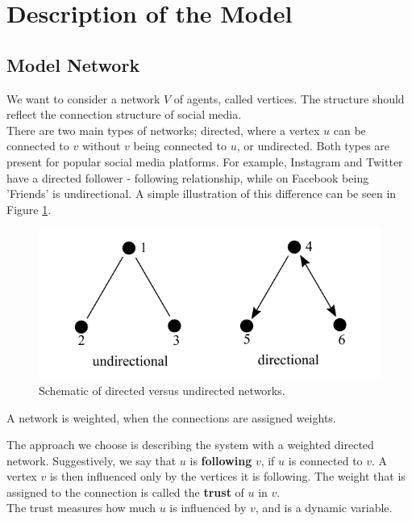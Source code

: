 \documentclass[11pt]{article}
\begin{document}
\section{Description of the Model}

\subsection{Model Network}

We want to consider a network $V$ of agents, called vertices. The structure should reflect the connection structure of social media.\\

There are two main types of networks; directed, where a vertex $u$ can be connected to $v$ without $v$ being connected to $u$, or undirected. Both types are present for popular social media platforms. For example, Instagram and Twitter have a directed follower - following relationship, while on Facebook being 'Friends' is undirectional. A simple illustration of this difference can be seen in Figure \ref{fig:dir_undir}.

\begin{figure}[h!]
    \centering
    \includegraphics[width = .5\linewidth]{img/dir_undir_network.pdf}
    \caption{Schematic of directed versus undirected networks.}
    \label{fig:dir_undir}
\end{figure}

A network is weighted, when the connections are assigned weights.

The approach we choose is describing the system with a weighted directed network. Suggestively, we say that $u$ is \textbf{following} $v$, if $u$ is connected to $v$. A vertex $v$ is then influenced only by the vertices it is following. The weight that is assigned to the connection is called the \textbf{trust} of $u$ in $v$.\\
The trust measures how much $u$ is influenced by $v$, and is a dynamic variable.
\end{document}
